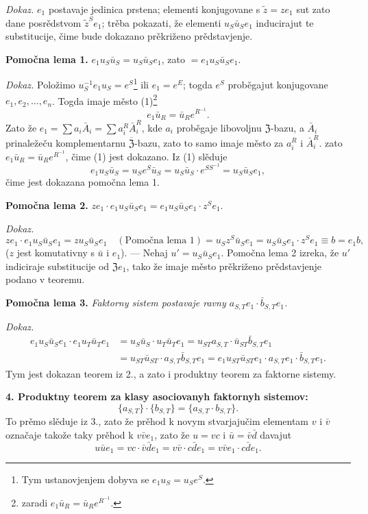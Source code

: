 \documentclass[11pt]{article}
\newcommand{\srcfn}[2]{\footnote{#2}}
\begin{document}
\noindent\emph{Dokaz.} \(e_1\) postavaje jedinica prstena; elementi konjugovane s \(\tilde z=ze_1\) sut zato dane posrědstvom \(\tilde z^Se_1\); trěba pokazati, že elementi \(u_S\bar u_Se_1\) inducirajut te substitucije, čime bude dokazano prěkriženo prědstavjenje.

\noindent\textbf{Pomočna lema 1.} \(e_1u_S\bar u_S=u_S\bar u_Se_1\), zato \(=e_1u_S\bar u_Se_1\).

\noindent\emph{Dokaz.} Položimo \(u_S^{-1}e_1u_S=e^S\)\srcfn{1}{Tym ustanovjenjem dobyva se \(e_1u_S=u_Se^S\).} ili \(e_1=e^E\); togda \(e^S\) proběgajut konjugovane \(e_1,e_2,\ldots,e_n\). Togda imaje město (1)\srcfn{2}{zaradi \(e_1\bar u_R=\bar u_Re^{R^{-1}}\).}
\[
e_1\bar u_R=\bar u_Re^{R^{-1}}.
\]
Zato že \(e_1=\sum a_i\bar A_i=\sum a_i^R\bar A_i^R\), kde \(a_i\) proběgaje libovoljnu \(\mathfrak Z\)-bazu, a \(\bar A_i\) prinaležeču komplementarnu \(\overline{\mathfrak Z}\)-bazu, zato to samo imaje město za \(a_i^R\) i \(\bar A_i^R\). zato \(e_1\bar u_R=\bar u_Re^{R^{-1}}\), čime (1) jest dokazano. Iz (1) slěduje
\[
e_1u_S\bar u_S=u_Se^S\bar u_S=u_S\bar u_S\cdot e^{SS^{-1}}=u_S\bar u_Se_1,
\]
čime jest dokazana pomočna lema 1.

\noindent\textbf{Pomočna lema 2.} \(ze_1\cdot e_1u_S\bar u_Se_1=e_1u_S\bar u_Se_1\cdot z^Se_1\).

\noindent\emph{Dokaz.} 
\[
ze_1\cdot e_1u_S\bar u_Se_1
=zu_S\bar u_Se_1\quad(\text{Pomočna lema 1})
=u_Sz^S\bar u_Se_1
=u_S\bar u_Se_1\cdot z^Se_1
\equiv b=e_1b,
\]
(\(z\) jest komutativny s \(\bar u\) i \(e_1\)). --- Nehaj \(u'=u_S\bar u_Se_1\). Pomočna lema 2 izreka, že \(u'\) indiciraje substitucije od \(\mathfrak Ze_1\), tako že imaje město prěkriženo prědstavjenje podano v teoremu.

\noindent\textbf{Pomočna lema 3.} \emph{Faktorny sistem postavaje ravny \(a_{S,T}e_1\cdot\bar b_{S,T}e_1\).}

\noindent\emph{Dokaz.}
\[
\begin{aligned}
e_1u_S\bar u_Se_1\cdot e_1u_T\bar u_Te_1
&=u_S\bar u_S\cdot u_T\bar u_Te_1
 =u_{ST}a_{S,T}\cdot\bar u_{ST}\bar b_{S,T}e_1\\
&=u_{ST}\bar u_{ST}\cdot a_{S,T}\bar b_{S,T}e_1
 =e_1u_{ST}\bar u_{ST}e_1\cdot a_{S,T}e_1\cdot\bar b_{S,T}e_1.
\end{aligned}
\]
Tym jest dokazan teorem iz 2., a zato i produktny teorem za faktorne sistemy.

\noindent\textbf{4. Produktny teorem za klasy asociovanyh faktornyh sistemov:}
\[
\{a_{S,T}\}\cdot\{b_{S,T}\}=\{a_{S,T}\cdot b_{S,T}\}.
\]
To prěmo slěduje iz 3., zato že prěhod k novym stvarjajučim elementam \(v\) i \(\bar v\) označaje takože taky prěhod k \(v\bar ve_1\), zato že \(u=vc\) i \(\bar u=\bar v\bar d\) davajut
\[
u\bar ue_1=vc\cdot\bar v\bar de_1=v\bar v\cdot c\bar de_1=v\bar ve_1\cdot c\bar de_1.
\]
\end{document}
